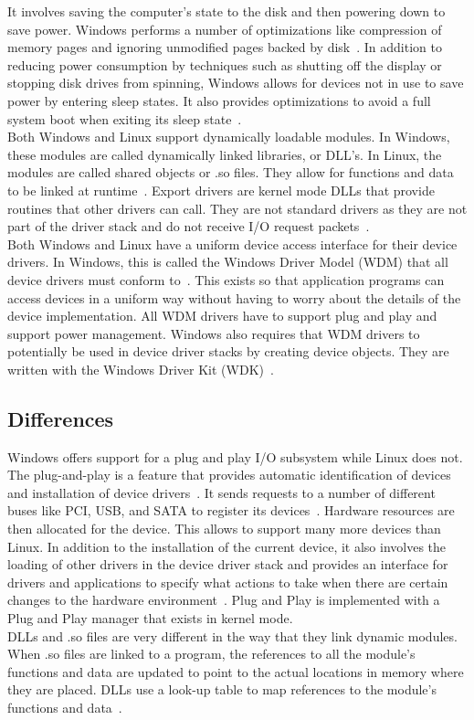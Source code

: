 \documentclass[letterpaper,10pt,titlepage]{article}
\begin{document}
It involves saving the computer's state to the disk and then powering down to
save power. Windows performs a number of optimizations like compression of 
memory pages and ignoring unmodified pages backed by disk~\cite{tm11}. In addition to 
reducing power consumption by techniques such as shutting off the display or 
stopping disk drives from spinning, Windows allows for devices not in use 
to save power by entering sleep states. It also provides optimizations
to avoid a full system boot when exiting its sleep state~\cite{tm11}.
\\
\linebreak
Both Windows and Linux support dynamically loadable modules. In Windows, these
modules are called dynamically linked libraries, or DLL's. In Linux, the 
modules are called shared objects or .so files. They allow for functions and 
data to be linked at runtime~\cite{link}. Export drivers are kernel mode DLLs that 
provide routines that other drivers can call. They are not standard drivers
as they are not part of the driver stack and do not receive I/O request 
packets~\cite{rsw9}.
\\
\linebreak
Both Windows and Linux have a uniform device access interface for their 
device drivers. In Windows, this is called the Windows Driver Model (WDM) 
that all device drivers must conform to~\cite{rsw9}. This exists so that application 
programs can access devices in a uniform way without having to worry about
the details of the device implementation. All WDM drivers have to support 
plug and play and support power management. Windows also requires that 
WDM drivers to potentially be used in device driver stacks by creating 
device objects. They are written with the Windows Driver Kit (WDK)~\cite{msdn-wdm}.
\subsection{Differences}
Windows offers support for a plug and play I/O subsystem while Linux does not.
The plug-and-play is a feature that provides automatic identification of 
devices and installation of device drivers~\cite{msdn-pnp}. It sends requests to a number of
different buses like PCI, USB, and SATA to register its devices~\cite{msdn-pnp}. Hardware 
resources are then allocated for the device. This allows to support many more
devices than Linux. In addition to the installation of the current device, 
it also involves the loading of other drivers in the device driver stack
and provides an interface for drivers and applications to specify what 
actions to take when there are certain changes to the hardware environment~\cite{tm11}.
Plug and Play is implemented with a Plug and Play manager that exists in 
kernel mode.
\\
\linebreak
DLLs and .so files are very different in the way that they link dynamic 
modules. When .so files are linked to a program, the references to all the 
module's functions and data are updated to point to the actual locations in 
memory where they are placed. DLLs use a look-up table to map references to 
the module's functions and data~\cite{link}.
\end{document}

